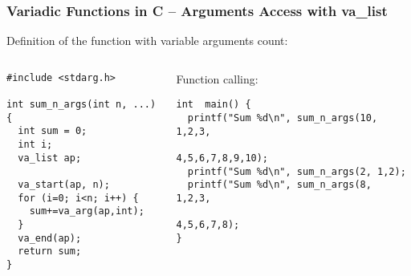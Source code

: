 \documentclass{beamer}
\begin{document}
\begin{frame}[fragile]
\frametitle{Variadic Functions in C -- Arguments Access with va\_list}

Definition of the function with variable arguments count:

\begin{columns}
\begin{column}{0.4\textwidth}
\begin{verbatim}
#include <stdarg.h>

int sum_n_args(int n, ...) {
  int sum = 0;
  int i;
  va_list ap;
  
  va_start(ap, n);
  for (i=0; i<n; i++) {
    sum+=va_arg(ap,int);
  }
  va_end(ap);
  return sum;
}
\end{verbatim}
\end{column}   
\begin{column}{0.6\textwidth}
Function calling:

\begin{verbatim}
int  main() {
  printf("Sum %d\n", sum_n_args(10, 1,2,3,
                          4,5,6,7,8,9,10);
  printf("Sum %d\n", sum_n_args(2, 1,2);
  printf("Sum %d\n", sum_n_args(8, 1,2,3,
                                4,5,6,7,8);
}
\end{verbatim}
\end{column}
\end{columns}

\end{frame}
\end{document}
